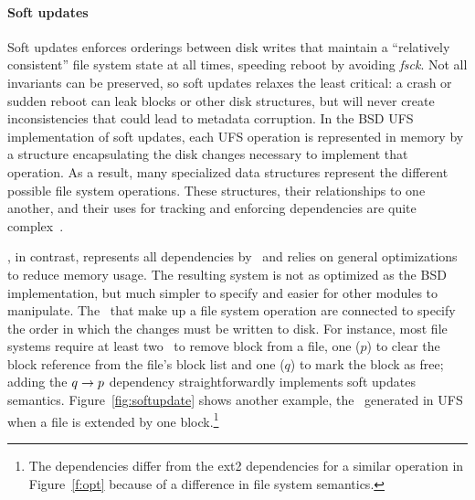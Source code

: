 
\paragraph{Soft updates}
\label{sec:using:softupdate}

%
Soft updates enforces orderings between disk writes that maintain
a ``relatively consistent'' file system state at all times, speeding
reboot by avoiding \emph{fsck}.
%
Not all invariants can be preserved, so soft updates relaxes the least
critical: a crash or sudden reboot can leak blocks or other disk
structures, but will never create inconsistencies that could lead to
metadata corruption.
%
%
%
In the BSD UFS implementation of soft updates, each UFS operation is
represented in memory by a structure encapsulating the disk changes
necessary to implement that operation. As a result, many
specialized data structures represent the different possible file system
operations. These structures, their relationships to one another, and their uses
for tracking and enforcing dependencies are quite
complex~\cite{mckusick99soft}.

\Kudos, in contrast, represents all dependencies by \patches\ and relies on
general optimizations to reduce memory usage.
%
The resulting system is not as optimized as the BSD implementation, but
much simpler to specify and easier for other modules to manipulate.
%
The \patches\ that make up a file system operation are connected to specify
the order in which the changes must be written to disk.
%
For instance, most file systems require at least two \patches\ to remove
block from a file, one ($p$) to clear the block reference from the file's
block list and one ($q$) to mark the block as free; adding the $q \rightarrow
p$ dependency straightforwardly implements soft updates semantics.
%
Figure~\ref{fig:softupdate} shows another example, the \patches\ generated in
UFS when a file is extended by one block.\footnote{The dependencies differ
from the ext2 dependencies for a similar operation in Figure~\ref{f:opt}
because of a difference in file system semantics.}

